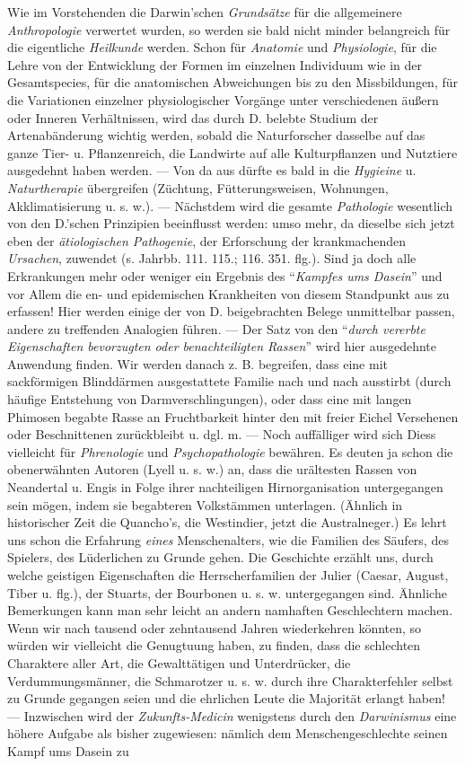 \documentclass[a4paper, 11pt, oneside, english]{article}
\begin{document}
Wie im Vorstehenden die Darwin'schen \emph{Grundsätze} für die allgemeinere \emph{Anthropologie} verwertet wurden, so werden sie bald nicht minder belangreich für die eigentliche \emph{Heilkunde} werden. Schon für \emph{Anatomie} und \emph{Physiologie}, für die Lehre von der Entwicklung der Formen im einzelnen Individuum wie in der Gesamtspecies, für die anatomischen Abweichungen bis zu den Missbildungen, für die Variationen einzelner physiologischer Vorgänge unter verschiedenen äußern oder Inneren Verhältnissen, wird das durch D. belebte Studium der Artenabänderung wichtig werden, sobald die Naturforscher dasselbe auf das ganze Tier- u. Pflanzenreich, die Landwirte auf alle Kulturpflanzen und Nutztiere ausgedehnt haben werden. --- Von da aus dürfte es bald in die \emph{Hygieine} u. \emph{Naturtherapie} übergreifen (Züchtung, Fütterungsweisen, Wohnungen, Akklimatisierung u. s. w.). --- Nächstdem wird die gesamte \emph{Pathologie} wesentlich von den D.'schen Prinzipien beeinflusst werden: umso mehr, da dieselbe sich jetzt eben der \emph{ätiologischen Pathogenie}, der Erforschung der krankmachenden \emph{Ursachen}, zuwendet (s. Jahrbb. 111. 115.; 116. 351. flg.). Sind ja doch alle Erkrankungen mehr oder weniger ein Ergebnis des "`\emph{Kampfes ums Dasein}"' und vor Allem die en- und epidemischen Krankheiten von diesem Standpunkt aus zu erfassen! Hier werden einige der von D. beigebrachten Belege unmittelbar passen, andere zu treffenden Analogien führen. --- Der Satz von den "`\emph{durch vererbte Eigenschaften bevorzugten oder benachteiligten Rassen}"' wird hier ausgedehnte Anwendung finden. Wir werden danach z. B. begreifen, dass eine mit sackförmigen Blinddärmen ausgestattete Familie nach und nach ausstirbt (durch häufige Entstehung von Darmverschlingungen), oder dass eine mit langen Phimosen begabte Rasse an Fruchtbarkeit hinter den mit freier Eichel Versehenen oder Beschnittenen zurückbleibt u. dgl. m. --- Noch auffälliger wird sich Diess vielleicht für \emph{Phrenologie} und \emph{Psychopathologie} bewähren. Es deuten ja schon die obenerwähnten Autoren (Lyell u. s. w.) an, dass die urältesten Rassen von Neandertal u. Engis in Folge ihrer nachteiligen Hirnorganisation untergegangen sein mögen, indem sie begabteren Volkstämmen unterlagen. (Ähnlich in historischer Zeit die Quancho's, die Westindier, jetzt die Australneger.) Es lehrt uns schon die Erfahrung \emph{eines} Menschenalters, wie die Familien des Säufers, des Spielers, des Lüderlichen zu Grunde gehen. Die Geschichte erzählt uns, durch welche geistigen Eigenschaften die Herrscherfamilien der Julier (Caesar, August, Tiber u. flg.), der Stuarts, der Bourbonen u. s. w. untergegangen sind. Ähnliche Bemerkungen kann man sehr leicht an andern namhaften Geschlechtern machen. Wenn wir nach tausend oder zehntausend Jahren wiederkehren könnten, so würden wir vielleicht die Genugtuung haben, zu finden, dass die schlechten Charaktere aller Art, die Gewalttätigen und Unterdrücker, die Verdummungsmänner, die Schmarotzer u. s. w. durch ihre Charakterfehler selbst zu Grunde gegangen seien und die ehrlichen Leute die Majorität erlangt haben! --- Inzwischen wird der \emph{Zukunfts-Medicin} wenigstens durch den \emph{Darwinismus} eine höhere Aufgabe als bisher zugewiesen: nämlich dem Menschengeschlechte seinen Kampf ums Dasein zu 
\end{document}
